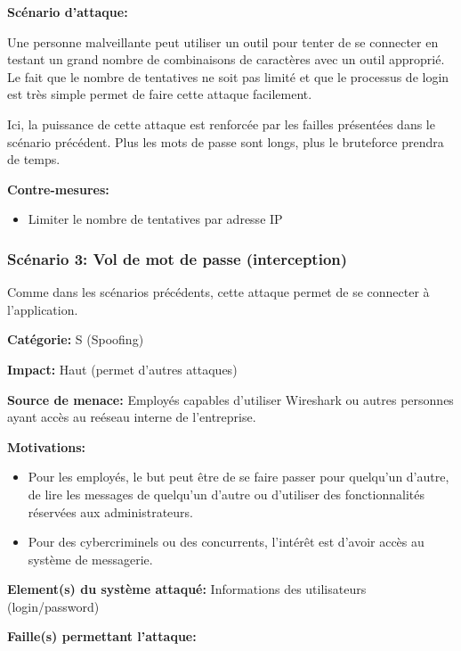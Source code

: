 \documentclass{article}
\begin{document}
\textbf{Scénario d'attaque:}

Une personne malveillante peut utiliser un outil pour tenter de se
connecter en testant un grand nombre de combinaisons de caractères avec
un outil approprié. Le fait que le nombre de tentatives ne soit pas
limité et que le processus de login est très simple permet de faire
cette attaque facilement.

Ici, la puissance de cette attaque est renforcée par les failles
présentées dans le scénario précédent. Plus les mots de passe sont
longs, plus le bruteforce prendra de temps.

\textbf{Contre-mesures:}

\begin{itemize}
\tightlist
\item
  Limiter le nombre de tentatives par adresse IP
\end{itemize}

\hypertarget{scuxe9nario-3-vol-de-mot-de-passe-interception}{%
\subsubsection{Scénario 3: Vol de mot de passe
(interception)}\label{scuxe9nario-3-vol-de-mot-de-passe-interception}}

Comme dans les scénarios précédents, cette attaque permet de se
connecter à l'application.

\textbf{Catégorie:} S (Spoofing)

\textbf{Impact:} Haut (permet d'autres attaques)

\textbf{Source de menace:} Employés capables d'utiliser Wireshark ou
autres personnes ayant accès au reéseau interne de l'entreprise.

\textbf{Motivations:}

\begin{itemize}
\tightlist
\item
  Pour les employés, le but peut être de se faire passer pour quelqu'un
  d'autre, de lire les messages de quelqu'un d'autre ou d'utiliser des
  fonctionnalités réservées aux administrateurs.
\item
  Pour des cybercriminels ou des concurrents, l'intérêt est d'avoir
  accès au système de messagerie.
\end{itemize}

\textbf{Element(s) du système attaqué:} Informations des utilisateurs
(login/password)

\textbf{Faille(s) permettant l'attaque:}
\end{document}
